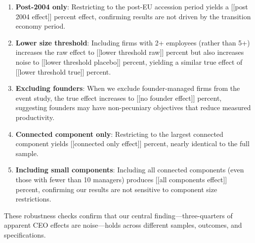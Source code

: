 \documentclass[11pt,a4paper]{article}
\begin{document}
\begin{enumerate}
\item \textbf{Post-2004 only}: Restricting to the post-EU accession period yields a [[post 2004 effect]] percent effect, confirming results are not driven by the transition economy period.

\item \textbf{Lower size threshold}: Including firms with 2+ employees (rather than 5+) increases the raw effect to [[lower threshold raw]] percent but also increases noise to [[lower threshold placebo]] percent, yielding a similar true effect of [[lower threshold true]] percent.

\item \textbf{Excluding founders}: When we exclude founder-managed firms from the event study, the true effect increases to [[no founder effect]] percent, suggesting founders may have non-pecuniary objectives that reduce measured productivity.

\item \textbf{Connected component only}: Restricting to the largest connected component yields [[connected only effect]] percent, nearly identical to the full sample.

\item \textbf{Including small components}: Including all connected components (even those with fewer than 10 managers) produces [[all components effect]] percent, confirming our results are not sensitive to component size restrictions.
\end{enumerate}

These robustness checks confirm that our central finding—three-quarters of apparent CEO effects are noise—holds across different samples, outcomes, and specifications.
\end{document}
